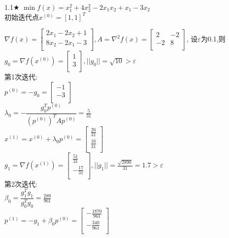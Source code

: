 \begin{problem}{1.1$\bigstar$}
    $\min f(x)=x_1^2+4x_2^2-2x_1x_2+x_1-3x_2$\\
    初始迭代点${x^{(0)}}=[1,1]^T$
\end{problem}
\begin{solution}
    $\nabla f(x)=\begin{bmatrix}
        2x_1-2x_2+1  \\
        8x_2-2x_1-3  \\
    \end{bmatrix}, A=\nabla^2 f(x)=\begin{bmatrix}
        2   & -2  \\
        -2  & 8  \\
    \end{bmatrix}$,
    设$\varepsilon$为0.1,则\\
    $g_0=\nabla f(x^{(0)})=\begin{bmatrix} 1\\3\\\end{bmatrix},||g_0||=\sqrt{10}>\varepsilon$\\
    第1次迭代:\\
    $p^{(0)}=-g_0=\begin{bmatrix} -1\\-3\\\end{bmatrix}$\\
    $\lambda_0=-\dfrac{g_0^Tp^{(0)}}{(p^{(0)})^TAp^{(0)}}=\frac{5}{31}$\\
    $x^{(1)}=x^{(0)}+\lambda_0p^{(0)}=\begin{bmatrix} \frac{26}{31}\\\frac{16}{31}\\\end{bmatrix}$\\
    $g_1=\nabla f(x^{(1)})=\begin{bmatrix} \frac{51}{31}\\-\frac{17}{31}\\\end{bmatrix},||g_1||=\frac{\sqrt{2890}}{31}=1.7>\varepsilon$\\
    第2次迭代:\\
    $\beta_0=\dfrac{g_1^Tg_1}{g_0^Tg_0}=\frac{289}{961}$\\
    $p^{(1)}=-g_1+\beta_0p^{(0)}=\begin{bmatrix} -\frac{1870}{961}\\-\frac{340}{961}\\\end{bmatrix}$\\

\end{solution}

